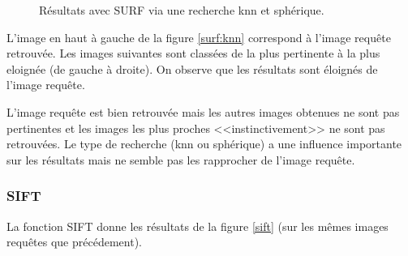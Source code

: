 \documentclass{article}
\begin{document}
\begin{figure}[!ht]%
  \centering
  \hspace{0.04\textwidth}
  \caption{Résultats avec SURF via une recherche knn et sphérique.}
  \label{surf}
\end{figure}

L'image en haut à gauche de la figure \ref{surf:knn} correspond à l'image requête retrouvée. Les images suivantes sont
classées de la plus pertinente à la plus eloignée (de gauche à droite).
On observe que les résultats sont éloignés de l'image requête. 

L'image requête est bien retrouvée mais les autres images obtenues ne sont pas pertinentes et les images les
plus proches <<instinctivement>> ne sont pas retrouvées. 
Le type de recherche (knn ou sphérique) a une influence importante sur les résultats mais ne semble pas les rapprocher de l'image requête. 

\subsubsection{SIFT}

La fonction SIFT donne les résultats de la figure \ref{sift} (sur les mêmes images requêtes que précédement).
\end{document}
